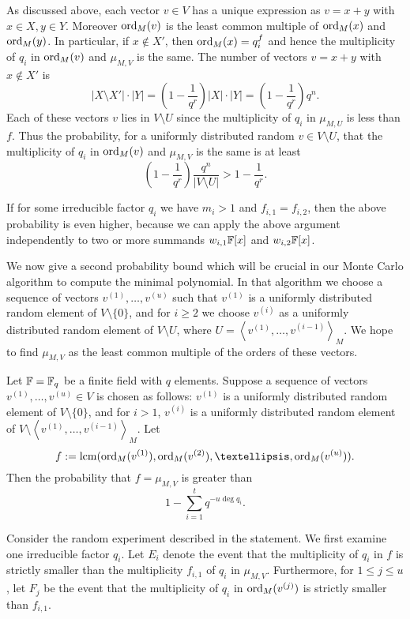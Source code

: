 \enlargethispage{1\baselineskip}
As discussed above, each vector $v\in V$ has a 
unique expression as $v=x+y$ with $x\in X, y\in Y$. Moreover
$\mathrm{ord}_M(v)$ is the least common multiple of $\mathrm{ord}_M(x)$ and $\mathrm{ord}_M(y)$.
In particular, if $x\not\in X'$, then $\mathrm{ord}_M(x)=q_i^{f}$ and hence
the multiplicity of $q_i$ in $\mathrm{ord}_M(v)$ and $\mu_{M,V}$ is the same.
The number of vectors $v=x+y$ with $x\not\in X'$ is 
\[
|X\setminus X'|\cdot |Y|=(1-\frac{1}{q^r})|X|\cdot|Y|=(1-\frac{1}{q^r})q^n.
\]
Each of these vectors $v$ lies in $V\setminus U$ since the multiplicity of
$q_i$ in $\mu_{M,U}$ is less than $f$. Thus the probability, for
a uniformly distributed random $v\in V\setminus U$, that the multiplicity 
of $q_i$ in $\mathrm{ord}_M(v)$ and $\mu_{M,V}$ is the same is at least
\[
(1-\frac{1}{q^r})\frac{q^n}{|V\setminus U|} > 1-\frac{1}{q^r}.
\]
\proofend

\begin{Rem}
If for some irreducible factor $q_i$ we have $m_i > 1$
and $f_{i,1} = f_{i,2}$, then the above probability is even higher,
because we can apply the above argument independently to two or more summands
$w_{i,1}\mathbb{F}[x]$ and $w_{i,2}\mathbb{F}[x]$.
\end{Rem}


\smallskip
We now give a second probability bound which will be crucial in our
Monte Carlo algorithm to compute the minimal polynomial. In 
that algorithm we choose  a sequence of vectors 
$v^{(1)}, \dots, v^{(u)}$ such that $v^{(1)}$ is a uniformly distributed
random element of $V\setminus\{0\}$, and for $i\geq2$ we choose
$v^{(i)}$ as a uniformly distributed random element of 
$V \setminus U$, where $U=\left< v^{(1)}, \ldots, v^{(i-1)} \right>_M$.
We hope to find $\mu_{M,V}$ as the least common multiple of the
orders of these vectors.


\begin{Prop}
\label{ProbAllMult}
Let\/ $\mathbb{F} = \mathbb{F}_q$ be a finite field with $q$ elements.
Suppose a sequence of vectors $v^{(1)}, \ldots, v^{(u)} \in V$ is chosen
as follows: $v^{(1)}$ is a uniformly
distributed random element of $V\setminus\{0\}$, and for $i>1$,
$v^{(i)}$ is a  uniformly distributed random element of  
$V \setminus \left< v^{(1)}, \ldots, v^{(i-1)} \right>_M$. 
Let
\[ 
f := \lcm( \ord_M(v^{(1)}), \ord_M(v^{(2)}), \ldots, 
\ord_M(v^{(u)}) ). 
\]
Then the probability that  $f = \mu_{M,V}$  is greater than
\[ 1-\sum_{i=1}^t q^{-u\deg q_i}. \]
\end{Prop}
\proofbeg
Consider the random experiment described in the statement. We first
examine one irreducible factor $q_i$. Let $E_i$ denote the event
that the multiplicity of $q_i$ in $f$ is strictly smaller than 
the multiplicity $f_{i,1}$ of $q_i$ in $\mu_{M,V}$. Furthermore, for
$1 \le j \le u$, let $F_j$  be the event that the multiplicity of $q_i$ in
$\mathrm{ord}_M(v^{(j)})$ is strictly smaller than $f_{i,1}$. 

